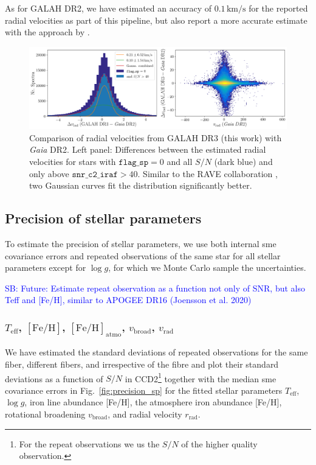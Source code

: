 \documentclass[fleqn,usenatbib,useAMS]{mnras}
\newcommand{\Teff}{$T_\mathrm{eff}$\xspace}
\newcommand{\logg}{$\log g$\xspace}
\newcommand{\feh}{$\mathrm{[Fe/H]}$\xspace}
\newcommand{\fehatmo}{$\mathrm{[Fe/H]}_\text{atmo}$\xspace}
\newcommand{\vbroad}{$v_\mathrm{broad}$\xspace}
\newcommand{\vrad}{$v_\mathrm{rad}$\xspace}
\newcommand{\Gaia}{\textit{Gaia}\xspace}
\newcommand\SB[1]{\textcolor{blue}{SB: #1}}
\begin{document}
As for GALAH DR2, we have estimated an accuracy of $0.1\,\mathrm{km/s}$ for the reported radial velocities as part of this pipeline, but also report a more accurate estimate with the approach by \citet{Zwitter2018}.

\begin{figure}
\centering
\includegraphics[width=\textwidth]{figures/radial_velocity_comparison.png}
\caption{Comparison of radial velocities from GALAH DR3 (this work) with \Gaia DR2. Left panel: Differences between the estimated radial velocities for stars with $\texttt{flag\_sp}=0$ and all $S/N$ (dark blue) and only above $\texttt{snr\_c2\_iraf} > 40$. Similar to the RAVE collaboration \citep{Steinmetz2020a}, two Gaussian curves fit the distribution significantly better.}
\label{fig:radial_velocities}
\end{figure}

\subsection{Precision of stellar parameters} \label{sec:precision_sp}

To estimate the precision of stellar parameters, we use both internal {\sc sme} covariance errors and repeated observations of the same star for all stellar parameters except for \logg, for which we Monte Carlo sample the uncertainties.

\SB{Future: Estimate repeat observation as a function not only of SNR, but also Teff and [Fe/H], similar to APOGEE DR16 (Joensson et al. 2020)}

\subsubsection{\Teff, \feh, \fehatmo, \vbroad, \vrad}

We have estimated the standard deviations of repeated observations for the same fiber, different fibers, and irrespective of the fibre and plot their standard deviations as a function of $S/N$ in CCD2\footnote{For the repeat observations we us the $S/N$ of the higher quality observation.} together with the median {\sc sme} covariance errors in Fig.~\ref{fig:precision_sp} for the fitted stellar parameters $T_\text{eff}$, $\log g$, iron line abundance [Fe/H], the atmosphere iron abundance [Fe/H], rotational broadening $v_\text{broad}$, and radial velocity $r_\text{rad}$. 
\end{document}
